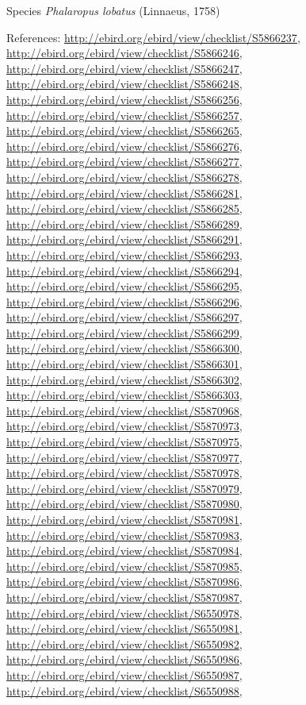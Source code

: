 \documentclass[9pt, article]{memoir}
\begin{document}
\begin{multicols}{2}
\vspace{6pt}\noindent\hspace{36pt}Species \textit{Phalaropus lobatus} (Linnaeus, 1758)


\vspace{6pt}References: 
\url{http://ebird.org/ebird/view/checklist/S5866237}, 
\url{http://ebird.org/ebird/view/checklist/S5866246}, 
\url{http://ebird.org/ebird/view/checklist/S5866247}, 
\url{http://ebird.org/ebird/view/checklist/S5866248}, 
\url{http://ebird.org/ebird/view/checklist/S5866256}, 
\url{http://ebird.org/ebird/view/checklist/S5866257}, 
\url{http://ebird.org/ebird/view/checklist/S5866265}, 
\url{http://ebird.org/ebird/view/checklist/S5866276}, 
\url{http://ebird.org/ebird/view/checklist/S5866277}, 
\url{http://ebird.org/ebird/view/checklist/S5866278}, 
\url{http://ebird.org/ebird/view/checklist/S5866281}, 
\url{http://ebird.org/ebird/view/checklist/S5866285}, 
\url{http://ebird.org/ebird/view/checklist/S5866289}, 
\url{http://ebird.org/ebird/view/checklist/S5866291}, 
\url{http://ebird.org/ebird/view/checklist/S5866293}, 
\url{http://ebird.org/ebird/view/checklist/S5866294}, 
\url{http://ebird.org/ebird/view/checklist/S5866295}, 
\url{http://ebird.org/ebird/view/checklist/S5866296}, 
\url{http://ebird.org/ebird/view/checklist/S5866297}, 
\url{http://ebird.org/ebird/view/checklist/S5866299}, 
\url{http://ebird.org/ebird/view/checklist/S5866300}, 
\url{http://ebird.org/ebird/view/checklist/S5866301}, 
\url{http://ebird.org/ebird/view/checklist/S5866302}, 
\url{http://ebird.org/ebird/view/checklist/S5866303}, 
\url{http://ebird.org/ebird/view/checklist/S5870968}, 
\url{http://ebird.org/ebird/view/checklist/S5870973}, 
\url{http://ebird.org/ebird/view/checklist/S5870975}, 
\url{http://ebird.org/ebird/view/checklist/S5870977}, 
\url{http://ebird.org/ebird/view/checklist/S5870978}, 
\url{http://ebird.org/ebird/view/checklist/S5870979}, 
\url{http://ebird.org/ebird/view/checklist/S5870980}, 
\url{http://ebird.org/ebird/view/checklist/S5870981}, 
\url{http://ebird.org/ebird/view/checklist/S5870983}, 
\url{http://ebird.org/ebird/view/checklist/S5870984}, 
\url{http://ebird.org/ebird/view/checklist/S5870985}, 
\url{http://ebird.org/ebird/view/checklist/S5870986}, 
\url{http://ebird.org/ebird/view/checklist/S5870987}, 
\url{http://ebird.org/ebird/view/checklist/S6550978}, 
\url{http://ebird.org/ebird/view/checklist/S6550981}, 
\url{http://ebird.org/ebird/view/checklist/S6550982}, 
\url{http://ebird.org/ebird/view/checklist/S6550986}, 
\url{http://ebird.org/ebird/view/checklist/S6550987}, 
\url{http://ebird.org/ebird/view/checklist/S6550988}, 

\end{multicols}
\end{document}
